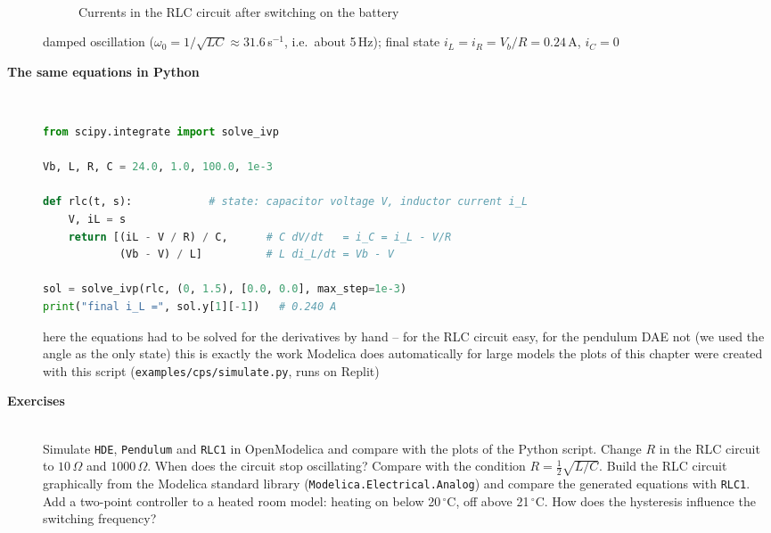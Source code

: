 \begin{description}
\begin{figure}[!hbtp]
     \begin{center}
	  \\
	  \caption{Currents in the RLC circuit after switching on the battery}
     \end{center}
\end{figure}
\bi
	\ite damped oscillation ($\omega_0 = 1/\sqrt{LC} \approx 31.6$\,s$^{-1}$, i.e.\ about 5\,Hz); final state $i_L = i_R = V_b/R = 0.24$\,A, $i_C = 0$
\ei
\os{\newpage}

\item[{\rot\bf The same equations in Python}]~\\[-\lstskip]
\begin{lstlisting}[language=Python]
from scipy.integrate import solve_ivp

Vb, L, R, C = 24.0, 1.0, 100.0, 1e-3

def rlc(t, s):            # state: capacitor voltage V, inductor current i_L
    V, iL = s
    return [(iL - V / R) / C,      # C dV/dt   = i_C = i_L - V/R
            (Vb - V) / L]          # L di_L/dt = Vb - V

sol = solve_ivp(rlc, (0, 1.5), [0.0, 0.0], max_step=1e-3)
print("final i_L =", sol.y[1][-1])   # 0.240 A
\end{lstlisting}
\bi
	\ite here the equations had to be solved for the derivatives by hand -- for the RLC circuit easy, for the pendulum DAE not (we used the angle as the only state)
	\ite this is exactly the work Modelica does automatically for large models
	\ite the plots of this chapter were created with this script (\texttt{examples/cps/simulate.py}, runs on Replit)
\ei
\os{\newpage}

\item[{\rot\bf Exercises}]~\\[-\lblskip]
\bi
	\ite Simulate \texttt{HDE}, \texttt{Pendulum} and \texttt{RLC1} in OpenModelica and compare with the plots of the Python script.
	\ite Change $R$ in the RLC circuit to $10\,\Omega$ and $1000\,\Omega$. When does the circuit stop oscillating? Compare with the condition $R = \frac{1}{2}\sqrt{L/C}$.
	\ite Build the RLC circuit graphically from the Modelica standard library (\texttt{Modelica.Electrical.Analog}) and compare the generated equations with \texttt{RLC1}.
	\ite Add a two-point controller to a heated room model: heating on below 20\,$^\circ$C, off above 21\,$^\circ$C. How does the hysteresis influence the switching frequency?
\ei
\os{\newpage}
\end{description}

